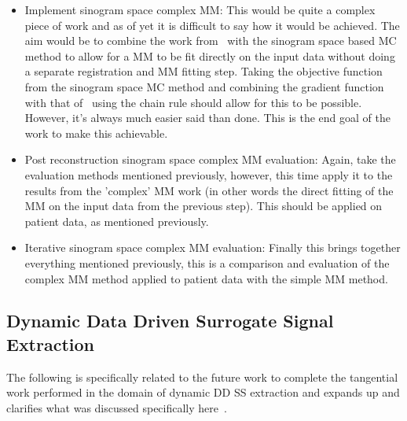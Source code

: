 \begin{itemize}
                \item Implement sinogram space complex \gls{MM}: This would be quite a complex piece of work and as of yet it is difficult to say how it would be achieved. The aim would be to combine the work from~ with the sinogram space based \gls{MC} method to allow for a \gls{MM} to be fit directly on the input data without doing a separate registration and \gls{MM} fitting step. Taking the objective function from the sinogram space \gls{MC} method and combining the gradient function with that of~ using the chain rule should allow for this to be possible. However, it's always much easier said than done. This is the end goal of the work to make this achievable.
    
                \item Post reconstruction sinogram space complex \gls{MM} evaluation: Again, take the evaluation methods mentioned previously, however, this time apply it to the results from the 'complex' \gls{MM} work (in other words the direct fitting of the \gls{MM} on the input data from the previous step). This should be applied on patient data, as mentioned previously.
    
                \item Iterative sinogram space complex \gls{MM} evaluation: Finally this brings together everything mentioned previously, this is a comparison and evaluation of the complex \gls{MM} method applied to patient data with the simple \gls{MM} method.
            \end{itemize}
        
        \subsection{Dynamic Data Driven Surrogate Signal Extraction} \label{sec:future_work_dynamic_data_driven_surrogate_signal_extraction}
            The following is specifically related to the future work to complete the tangential work performed in the domain of dynamic \gls{DD} \gls{SS} extraction and expands up and clarifies what was discussed specifically here~.
            
